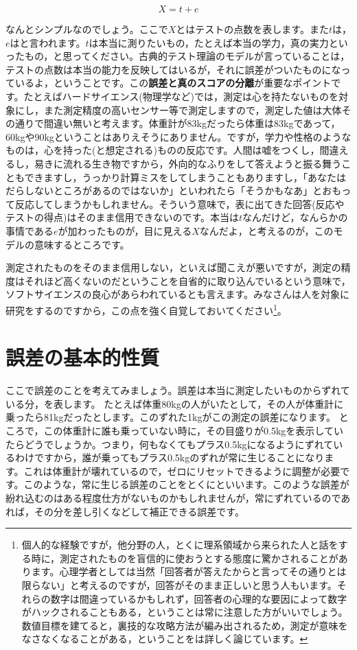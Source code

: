 \documentclass{ltjbook}
\begin{document}
\[ X = t + e \]

なんとシンプルなのでしょう。ここで$X$とはテストの点数を表します。また$t$は，$e$はと言われます。$t$は本当に測りたいもの，たとえば本当の学力，真の実力といったもの，と思ってください。古典的テスト理論のモデルが言っていることは，テストの点数は本当の能力を反映してはいるが，それに誤差がついたものになっているよ，ということです。この\textbf{誤差と真のスコアの分離}が重要なポイントです。たとえばハードサイエンス(物理学など)では，測定は心を持たないものを対象にし，また測定精度の高いセンサー等で測定しますので，測定した値は大体その通りで間違い無いと考えます。体重計が83kgだったら体重は83kgであって，60kgや90kgということはありえそうにありません。ですが，学力や性格のようなものは，心を持った(と想定される)ものの反応です。人間は嘘をつくし，間違えるし，易きに流れる生き物ですから，外向的なふりをして答えようと振る舞うこともできますし，うっかり計算ミスをしてしまうこともありますし，「あなたはだらしないところがあるのではないか」といわれたら「そうかもなあ」とおもって反応してしまうかもしれません。そういう意味で，表に出てきた回答(反応やテストの得点)はそのまま信用できないのです。本当は$t$なんだけど，なんらかの事情である$e$が加わったものが，目に見える$X$なんだよ，と考えるのが，このモデルの意味するところです。

測定されたものをそのまま信用しない，といえば聞こえが悪いですが，測定の精度はそれほど高くないのだということを自省的に取り込んでいるという意味で，ソフトサイエンスの良心があらわれているとも言えます。みなさんは人を対象に研究をするのですから，この点を強く自覚しておいてください\footnote{個人的な経験ですが，他分野の人，とくに理系領域から来られた人と話をする時に，測定されたものを盲信的に使おうとする態度に驚かされることがあります。心理学者としては当然「回答者が答えたからと言ってその通りとは限らない」と考えるのですが，回答がそのまま正しいと思う人もいます。それらの数字は間違っているかもしれず，回答者の心理的な要因によって数字がハックされることもある，ということは常に注意した方がいいでしょう。数値目標を建てると，裏技的な攻略方法が編み出されるため，測定が意味をなさなくなることがある，ということを\textcite{Jerry2019}は詳しく論じています。}。


\section{誤差の基本的性質}
ここで誤差のことを考えてみましょう。誤差は本当に測定したいものからずれている分，を表します。
たとえば体重80kgの人がいたとして，その人が体重計に乗ったら81kgだったとします。このずれた1kgがこの測定の誤差になります。
ところで，この体重計に誰も乗っていない時に，その目盛りが0.5kgを表示していたらどうでしょうか。つまり，何もなくてもプラス0.5kgになるようにずれているわけですから，誰が乗ってもプラス0.5kgのずれが常に生じることになります。これは体重計が壊れているので，ゼロにリセットできるように調整が必要です。このような，常に生じる誤差のことをとくにといいます。このような誤差が紛れ込むのはある程度仕方がないものかもしれませんが，常にずれているのであれば，その分を差し引くなどして補正できる誤差です。
\end{document}
